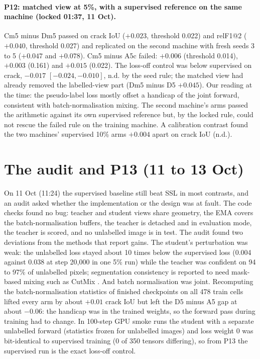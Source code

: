\paragraph{P12: matched view at 5\%, with a supervised reference on the same machine (locked 01:37, 11 Oct).} Cm5 minus Dm5 passed on
crack IoU ($+0.023$, threshold 0.022) and relF1@2 ($+0.040$, threshold 0.027) and replicated on the second machine with fresh seeds
3 to 5 ($+0.047$ and $+0.078$). Cm5 minus A5c failed: $+0.006$ (threshold 0.014), $+0.003$ (0.161) and $+0.015$ (0.022). The loss-off
control was below supervised on crack, $-0.017$ $[-0.024, -0.010]$, n.d. by the seed rule; the matched view had already removed the
labelled-view part (Dm5 minus D5 $+0.045$). Our reading at the time: the pseudo-label loss mostly offset a handicap of the joint
forward, consistent with batch-normalisation mixing. The second machine's arms passed the arithmetic against its own supervised
reference but, by the locked rule, could not rescue the failed rule on the training machine. A calibration contrast found the two
machines' supervised 10\% arms $+0.004$ apart on crack IoU (n.d.).

\section{The audit and P13 (11 to 13 Oct)}\label{sec:pseries-p13}

On 11 Oct (11:24) the supervised baseline still beat SSL in most contrasts, and an audit asked whether the implementation or the
design was at fault. The code checks found no bug: teacher and student views share geometry, the EMA covers the batch-normalisation
buffers, the teacher is detached and in evaluation mode, the teacher is scored, and no unlabelled image is in test. The audit found
two deviations from the methods that report gains. The student's perturbation was weak: the unlabelled loss stayed about 10 times
below the supervised loss (0.004 against 0.038 at step 20,000 in one 5\% run) while the teacher was confident on 94 to 97\% of
unlabelled pixels; segmentation consistency is reported to need mask-based mixing such as CutMix \citep{yun2019cutmix}
\citep{french2020semiseg}. And batch normalisation
was joint. Recomputing the batch-normalisation statistics of finished checkpoints on all 478 train cells lifted every arm by about
$+0.01$ crack IoU but left the D5 minus A5 gap at about $-0.06$: the handicap was in the trained weights, so the forward pass during
training had to change. In 100-step GPU smoke runs the student with a separate unlabelled forward (statistics frozen for unlabelled
images) and loss weight 0 was bit-identical to supervised training (0 of 350 tensors differing), so from P13 the supervised run is
the exact loss-off control.

